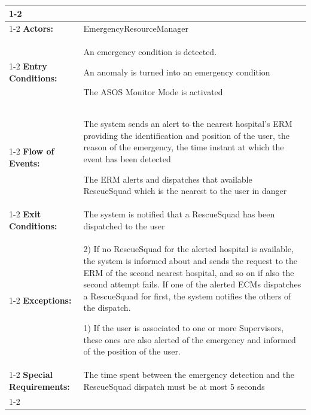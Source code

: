 \begin{table}[H]
	\centering
	{\renewcommand{\arraystretch}{1.5}%
		\begin{tabular}{|@{\hspace{2em}} p{4cm} @{}| p{11cm} @{\qquad}|}
			\cline{1-2}
			\multicolumn{2}{|c|}{\textbf{An Emergeny Condition is Detected}} \\ \cline{1-2}
			\textbf{Actors:} & EmergencyResourceManager \\ \cline{1-2}
			\textbf{Entry Conditions:} &
			\setlength{\parskip}{-0.2cm}
			\setlength{\parindent}{-0.2cm} \begin{itemize}[topsep=0em, itemsep=-0.2em]
				{\small \item An emergency condition is detected.
				\item An anomaly is turned into an emergency condition
				\item The ASOS Monitor Mode is activated}
			\end{itemize} \\ \cline{1-2}
			\textbf{Flow of Events:} &
			\setlength{\parskip}{-0.2cm}
			\setlength{\parindent}{-0.2cm} \begin{enumerate}[topsep=0em, itemsep=-0.2em]
				{\small\item The system sends an alert to the nearest hospital's ERM providing the identification and position of the user, the reason of the emergency, the time instant at which the event has been detected
				\item The ERM alerts and dispatches that available RescueSquad which is the nearest to the user in danger}
			\end{enumerate}\\ \cline{1-2}
			\textbf{Exit Conditions:} & The system is notified that a RescueSquad has been dispatched to the user \\ \cline{1-2}
			\textbf{Exceptions:} & 
			\setlength{\parskip}{-0.2cm}
			\setlength{\parindent}{-0.2cm}
			\begin{itemize}[topsep=0cm, itemsep=-0.2em]
				{\small \item 2) If no RescueSquad for the alerted hospital is available, the system is informed about and sends the request to the ERM of the second nearest hospital, and so on if also the second attempt fails. If one of the alerted ECMs dispatches a RescueSquad for first, the system notifies the others of the dispatch.
				\item 1) If the user is associated to one or more Supervisors, these ones are also alerted of the emergency and informed of the position of the user. }
			\end{itemize} \\ \cline{1-2}
			\textbf{Special Requirements:} & The time spent between the emergency detection and the RescueSquad dispatch must be at most 5 seconds \\ \cline{1-2}
	\end{tabular}} \quad
\end{table}

